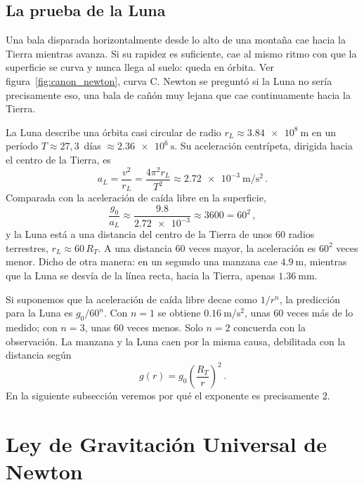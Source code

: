 \documentclass[11pt,a4paper]{book}
\begin{document}
\subsection{La prueba de la Luna}
\label{subsec:prueba_luna}

Una bala disparada horizontalmente desde lo alto de una montaña cae hacia la
Tierra mientras avanza. Si su rapidez es suficiente, cae al mismo ritmo con
que la superficie se curva y nunca llega al suelo: queda en órbita. Ver figura~\ref{fig:canon_newton}, curva C. Newton se
preguntó si la Luna no sería precisamente eso, una bala de cañón muy lejana
que cae continuamente hacia la Tierra.

La Luna describe una órbita casi circular de radio
$r_L \approx \SI{3.84e8}{\meter}$ en un período $T \approx 27{,}3$~días
$\approx \SI{2.36e6}{\second}$. Su aceleración centrípeta, dirigida hacia el
centro de la Tierra, es
\begin{equation}
  a_L = \frac{v^{2}}{r_L} = \frac{4\pi^{2} r_L}{T^{2}}
  \approx \SI{2.72e-3}{\meter\per\second\squared} \,.
  \label{eq:aceleracion_luna}
\end{equation}
Comparada con la aceleración de caída libre en la superficie,
\begin{equation}
  \frac{g_0}{a_L} \approx \frac{\num{9.8}}{\num{2.72e-3}}
  \approx 3600 = 60^{2} \,,
  \label{eq:cociente_luna}
\end{equation}
y la Luna está a una distancia del centro de la Tierra de unos $60$ radios
terrestres, $r_L \approx 60\,R_T$. A una distancia $60$ veces mayor, la
aceleración es $60^{2}$ veces menor. Dicho de otra manera: en un segundo una
manzana cae $\SI{4.9}{\meter}$, mientras que la Luna se desvía de la línea
recta, hacia la Tierra, apenas $\SI{1.36}{\milli\meter}$.

Si suponemos que la aceleración de caída libre decae como $1/r^{n}$, la
predicción para la Luna es $g_0/60^{n}$. Con $n = 1$ se obtiene
$\SI{0.16}{\meter\per\second\squared}$, unas $60$ veces más de lo medido;
con $n = 3$, unas $60$ veces menos. Solo $n = 2$ concuerda con la
observación. La manzana y la Luna caen por la misma causa, debilitada con la
distancia según
\begin{equation}
  g(r) = g_0 \left( \frac{R_T}{r} \right)^{2} \,.
  \label{eq:g_inverso_cuadrado}
\end{equation}
En la siguiente subsección veremos por qué el exponente es precisamente
$2$.


\section{Ley de Gravitación Universal de Newton}
\end{document}

